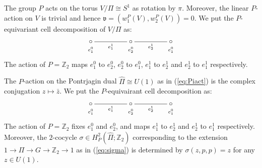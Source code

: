 \documentclass[11pt]{amsart}
\theoremstyle{definition}
\theoremstyle{plain}
\theoremstyle{remark}
\newcommand{\bZ}{\mathbb{Z}}
\newcommand{\fv}{\mathfrak{v}}
\begin{document}
The group $P$ acts on the torus $V/\Pi \cong S^1$ as rotation by $\pi$. Moreover, the linear $P$-action on $V$ is trivial and hence $\fv=(w_1^P(V),w_2^P(V)) =0$. We put the $P$-equivariant cell decomposition of $V/\Pi$ as:
\[
\xygraph{
!{<0cm,0cm>;<2cm,0cm>:<0cm,2cm>::}
!{(0,0) }*+{\circ }="1" ([]!{+(0,-0.2)} {\scriptstyle e_1^0})
!{(1,0) }*+{\circ }="2" ([]!{+(0,-0.2)} {\scriptstyle e_2^0})
!{(2,0) }*+{\circ} ="3" ([]!{+(0,-0.2)} {\scriptstyle e_1^0})
"1"-"2"_{e_1^1} "2"-"3"_{e_2^1}
}
\]
The action of $P=\bZ_2$ maps $e_1^0$ to $e_2^0$, $e_2^0$ to $e_1^0$, $e_{1}^1$ to $e_{2}^1$ and $e_{2}^1$ to $e_{1}^1$ respectively. 

The $P$-action on the Pontrjagin dual $\hat{\Pi} \cong U(1)$ as in (\ref{eq:Piact}) is the complex conjugation $z \mapsto \bar{z}$. We put the $P$-equivairant cell decomposition as:
\[
\xygraph{
!{<0cm,0cm>;<2cm,0cm>:<0cm,2cm>::}
!{(0,0) }*+{\circ }="1" ([]!{+(0,-0.2)} {\scriptstyle e_1^0})
!{(1,0) }*+{\circ }="2" ([]!{+(0,-0.2)} {\scriptstyle e_2^0})
!{(2,0) }*+{\circ} ="3" ([]!{+(0,-0.2)} {\scriptstyle e_1^0})
"1"-"2"_{e_1^1} "2"-"3"_{e_2^1}
}
\]
The action of $P=\bZ_2$ fixes $e_1^0$ and $e_2^0$, and maps $e_{1}^1$ to $e_{2}^1$ and $e_{2}^1$ to $e_{1}^1$ respectively. 
Moreover, the $2$-cocycle $\sigma \in H^2_P(\hat{\Pi}; \bZ_2)$ corresponding to the extension $1 \to \Pi \to G \to \bZ_2 \to 1$ as in (\ref{eq:sigma}) is determined by $\sigma (z,p,p)=z$ for any $z \in U(1)$.
\end{document}
